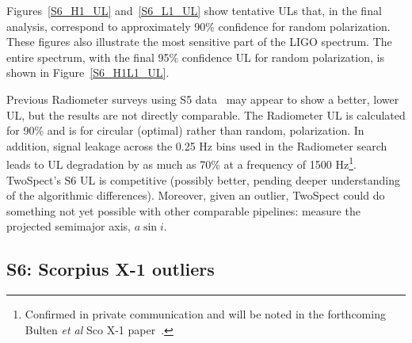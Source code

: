 Figures~\ref{S6_H1_UL} and~\ref{S6_L1_UL} show tentative ULs that, in the final analysis, correspond to approximately 90\% confidence for random polarization.
These figures also illustrate the most sensitive part of the LIGO spectrum.
The entire spectrum, with the final 95\% confidence UL for random polarization, is shown in Figure~\ref{S6_H1L1_UL}.

Previous Radiometer surveys using S5 data~\cite{AbadieStoch2011} may appear to show a better, lower UL, but the results are not directly comparable.
The Radiometer UL is calculated for 90\% and is for circular (optimal) rather than random, polarization.
In addition, signal leakage across the 0.25 Hz bins used in the Radiometer search leads to UL degradation by as much as 70\% at a frequency of 1500 Hz\footnote{Confirmed in private communication and will be noted in the forthcoming Bulten \textit{et al} Sco X-1 paper~\cite{ScoX1MDC2014DCC}.}.
TwoSpect's S6 UL is competitive (possibly better, pending deeper understanding of the algorithmic differences).
Moreover, given an outlier, TwoSpect could do something not yet possible with other comparable pipelines: measure the projected semimajor axis, $a \sin i$.

\subsection{S6: Scorpius X-1 outliers}

